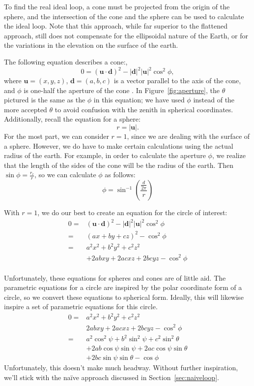 \documentclass[twocolumn,12pt]{article}
\begin{document}
To find the real ideal loop, a cone must be projected from the origin of the
sphere, and the intersection of the cone and the sphere can be used to calculate
the ideal loop. Note that this approach, while far superior to the flattened
approach, still does not compensate for the ellipsoidal nature of the Earth, or
for the variations in the elevation on the surface of the earth.

The following equation describes a cone:,
\[ 0 = (\bm{u} \cdot \bm{d})^2 - |\bm{d}|^2|\bm{u}|^2\cos^2 \phi , \]
where $\bm{u}= (x,y,z)$, $\bm{d} = (a,b,c)$ is a vector parallel to the axis of
the cone, and $\phi$ is one-half the aperture of the cone . In
Figure~\ref{fig:aperture}, the $\theta$ pictured is the same as the $\phi$ in
this equation; we have used $\phi$ instead of the more accepted $\theta$ to
avoid confusion with the zenith in spherical coordinates.
Additionally, recall the equation for a sphere:
\[ r = |\bm{u}|. \]
For the most part, we can consider $r = 1$, since we are dealing with the
surface of a sphere. However, we do have to make certain calculations using
the actual radius of the earth. For example, in order to calculate the
aperture $\phi$, we realize that the length of the sides of the cone will be the
radius of the earth. Then $\sin \phi = \frac{r_c}{r}$, so we can calculate
$\phi$ as follows:
\begin{equation}
  \phi = \sin^{-1} \left( \frac{\frac{d}{2\pi}}{r} \right) \label{eq:phi}
\end{equation}

With $r = 1$, we do our best to create an equation for the circle of interest:
\begin{align*}
  0 = & (\bm{u}\cdot \bm{d})^2 - |\bm{d}|^2|\bm{u}|^2\cos^2 \phi \\
    = & (ax + by + cz)^2 - \cos^2 \phi \\
    = & a^2x^2 + b^2y^2 + c^2z^2 \\
    & + 2abxy + 2acxz
     + 2bcyz - \cos^2 \phi \\
\end{align*}

Unfortunately, these equations for spheres and cones are of little aid. The
 parametric equations for a circle are inspired by the polar coordinate form
of a circle, so we convert these equations to spherical form. Ideally, this will
likewise inspire a set of parametric equations for this circle.
\begin{align*}
  0 = & a^2x^2 + b^2y^2 + c^2z^2 \\
      & 2abxy + 2acxz + 2bcyz - \cos^2 \phi \\
    = & a^2\cos^2 \psi + b^2\sin^2 \psi + c^2\sin^2 \theta \\
      & + 2ab\cos \psi\sin \psi + 2ac\cos \psi \sin \theta \\
      & + 2bc\sin \psi \sin \theta  - \cos \phi
\end{align*}
Unfortunately, this doesn't make much headway. Without further inspiration,
we'll stick with the na\"{i}ve approach discussed in
Section~\ref{sec:naiveloop}.
\end{document}
